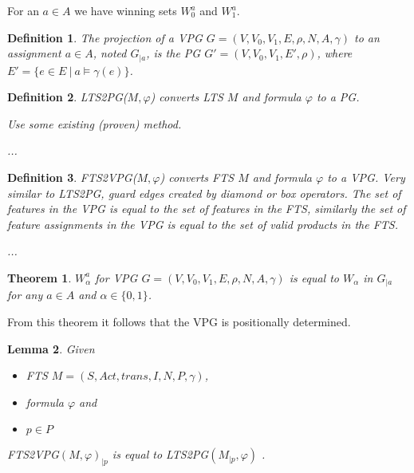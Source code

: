 \documentclass[]{article}
\newtheorem{definition}{Definition}[section]
\newtheorem{theorem}{Theorem}[section]
\newtheorem{lemma}[theorem]{Lemma}
\begin{document}
For an $a \in A$ we have winning sets $W_0^a$ and $W_1^a$.

\begin{definition}
	The projection of a VPG $G = (V,V_0, V_1, E, \rho, N, A, \gamma)$ to an assignment $a \in A$, noted $G_{|a}$, is the PG $G' = (V, V_0, V_1, E', \rho)$, where $E' = \{ e \in E\ |\ a \models \gamma(e)\}$.
\end{definition}

\begin{definition}
	LTS2PG($M, \varphi$) converts LTS $M$ and formula $\varphi$ to a PG.
	
	Use some existing (proven) method.
	
	...
\end{definition}
\begin{definition}
	FTS2VPG($M, \varphi$) converts FTS $M$ and formula $\varphi$ to a VPG. Very similar to LTS2PG, guard edges created by diamond or box operators. The set of features in the VPG is equal to the set of features in the FTS, similarly the set of feature assignments in the VPG is equal to the set of valid products in the FTS.

...
\end{definition}


\begin{theorem}
	\label{vpgproj}
	$W_\alpha^a$ for VPG $G = (V,V_0, V_1, E, \rho, N, A, \gamma)$ is equal to $W_\alpha$ in $G_{|a}$ for any $a \in A$ and $\alpha \in \{0,1\}$.
\end{theorem}

From this theorem it follows that the VPG is positionally determined.

\begin{lemma}
	\label{vpgftsproj}
	Given 
	\begin{itemize}
		\item FTS $M = (S, Act, trans, I, N, P, \gamma)$,
		\item formula $\varphi$ and
		\item $p \in P$
	\end{itemize}
	FTS2VPG$(M, \varphi)_{|p}$ is equal to LTS2PG$(M_{|p},\varphi)$ .
\end{lemma}
\end{document}

